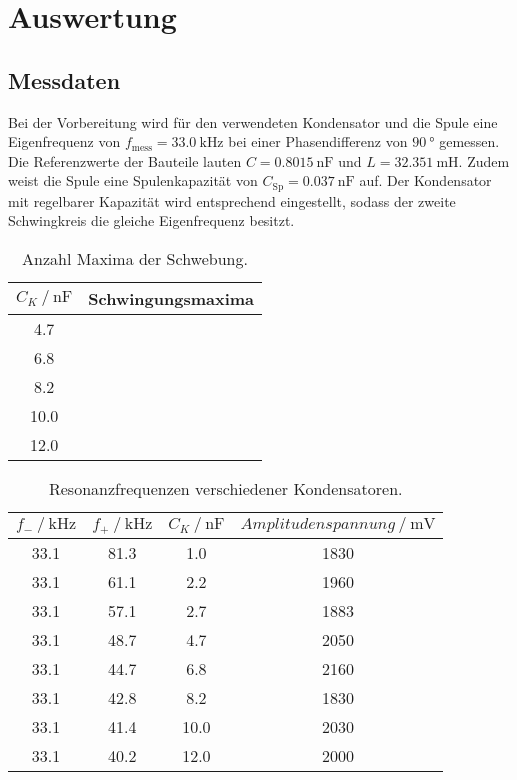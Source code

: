 \section{Auswertung}
\label{sec:Auswertung}

\subsection{Messdaten}
Bei der Vorbereitung wird für den verwendeten Kondensator und die Spule eine Eigenfrequenz von 
$f_{\text{mess}}=\SI{33.0}{\kilo\hertz}$ bei einer Phasendifferenz von $\SI{90}{\degree}$ gemessen. 
Die Referenzwerte der Bauteile lauten $C=\SI{0.8015}{\nano\farad}$ und $L=\SI{32.351}{\milli\henry}$. 
Zudem weist die Spule eine Spulenkapazität von $C_\text{Sp}=\SI{0.037}{\nano\farad}$ auf.
Der Kondensator mit regelbarer Kapazität wird entsprechend eingestellt, sodass der zweite Schwingkreis die gleiche Eigenfrequenz besitzt.


\begin{table}
    \centering
    \caption{Anzahl Maxima der Schwebung.}
    \label{tab:schwing_maxima}
    \begin{tabular}{c c}
        \toprule
        {$C_K \:/\: \si{\nano\farad}$} & Schwingungsmaxima \\
        \midrule
        4.7  & \\ 
        6.8  & \\ 
        8.2  & \\ 
        10.0 & \\ 
        12.0 & \\ 
        \bottomrule
    \end{tabular}
\end{table}

\begin{table}
    \centering
    \caption{Resonanzfrequenzen verschiedener Kondensatoren.}
    \label{tab:resonanz}
    \begin{tabular}{c c c c}
        \toprule
        $f_- \:/\: \si{\kilo\hertz}$ & $f_+ \:/\: \si{\kilo\hertz}$ & $C_K \:/\: \si{\nano\farad}$ & $Amplitudenspannung \:/\: \si{\milli\volt}$ \\
        \midrule
        33.1 & 81.3 & 1.0  & 1830 \\
        33.1 & 61.1 & 2.2  & 1960 \\
        33.1 & 57.1 & 2.7  & 1883 \\
        33.1 & 48.7 & 4.7  & 2050 \\
        33.1 & 44.7 & 6.8  & 2160 \\
        33.1 & 42.8 & 8.2  & 1830 \\
        33.1 & 41.4 & 10.0 & 2030 \\
        33.1 & 40.2 & 12.0 & 2000 \\
        \bottomrule
    \end{tabular}
\end{table}

